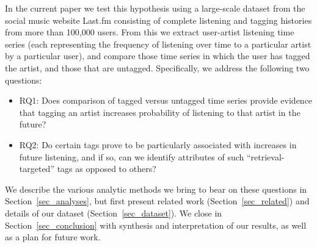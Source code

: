 In the current paper we test this hypothesis using a large-scale dataset from the social music website Last.fm consisting of complete listening and tagging histories from more than 100,000 users. From this we extract user-artist listening time series (each representing the frequency of listening over time to a particular artist by a particular user), and compare those time series in which the user has tagged the artist, and those that are untagged. Specifically, we address the following two questions:
\begin{itemize}
	\item RQ1: Does comparison of tagged versus untagged time series provide evidence that tagging an artist increases probability of listening to that artist in the future?
	\item RQ2: Do certain tags prove to be particularly associated with increases in future listening, and if so, can we identify attributes of such ``retrieval-targeted'' tags as opposed to others?
\end{itemize}

We describe the various analytic methods we bring to bear on these questions in Section~\ref{sec_analyses}, but first present related work (Section~\ref{sec_related}) and details of our dataset (Section~\ref{sec_dataset}). We close in Section~\ref{sec_conclusion} with synthesis and interpretation of our results, as well as a plan for future work.
